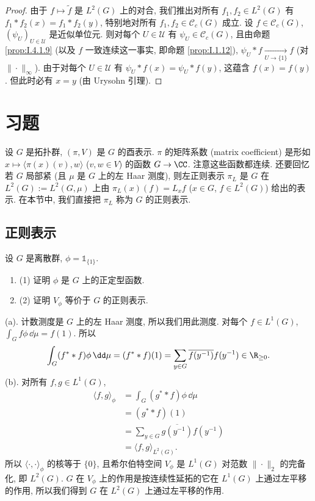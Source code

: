 \begin{proof}
由于 $f \longmapsto \tilde{f}$ 是 $L^2(G)$ 上的对合, 我们推出对所有 $f_1, f_2 \in L^2(G)$ 有 $f_1 * f_2(x) = f_1 * f_2(y)$, 特别地对所有 $f_1, f_2 \in \mathcal{C}_c(G)$ 成立. 设 $f \in \mathcal{C}_c(G)$, $(\psi_U)_{U \in \mathcal{U}}$ 是近似单位元. 则对每个 $U \in \mathcal{U}$ 有 $\psi_U \in \mathcal{C}_c(G)$, 且由命题 \ref{prop:I.4.1.9} (以及 $f$ 一致连续这一事实, 即命题 \ref{prop:I.1.12}), $\psi_U * f \xrightarrow[U \to \{1\}]{} f$ (对 $\|\cdot\|_{\infty}$). 由于对每个 $U \in \mathcal{U}$ 有 $\psi_U * f(x) = \psi_U * f(y)$, 这蕴含 $f(x) = f(y)$. 但此时必有 $x = y$ (由 Urysohn 引理).
\end{proof}

\section{习题}
设 $G$ 是拓扑群, $(\pi, V)$ 是 $G$ 的酉表示. $\pi$ 的矩阵系数 (matrix coefficient) 是形如 $x \longmapsto \langle \pi(x)(v), w \rangle$ ($v, w \in V$) 的函数 $G \to \CC$. 注意这些函数都连续.
还要回忆若 $G$ 局部紧 (且 $\mu$ 是 $G$ 上的左 Haar 测度), 则左正则表示 $\pi_L$ 是 $G$ 在 $L^2(G) := L^2(G, \mu)$ 上由 $\pi_L(x)(f) = L_xf$ ($x \in G$, $f \in L^2(G)$) 给出的表示. 在本节中, 我们直接把 $\pi_L$ 称为 $G$ 的正则表示.

\subsection{正则表示}

\begin{exercise}[离散群的情形]
\label{ex:III.6.1.1}
设 $G$ 是离散群, $\phi = \mathbb{1}_{\{1\}}$.
\begin{enumerate}
\item[(a)] (1) 证明 $\phi$ 是 $G$ 上的正定型函数.
\item[(b)] (2) 证明 $V_{\phi}$ 等价于 $G$ 的正则表示.
\end{enumerate}
\end{exercise}

\begin{solution}
(a). 计数测度是 $G$ 上的左 Haar 测度, 所以我们用此测度. 对每个 $f \in L^1(G)$, $\int_G f\phi\,\dd\mu = f(1)$. 所以
\[
\int_G (f^* * f)\phi\,\dd\mu = (f^* * f)(1) = \sum_{y \in G}\overline{f(y^{-1})}f(y^{-1}) \in \R_{\geq 0}.
\]
(b). 对所有 $f, g \in L^1(G)$,
\begin{align*}
\langle f, g \rangle_{\phi} &= \int_G (g^* * f)\phi\,\dd\mu \\
&= (g^* * f)(1) \\
&= \sum_{y \in G}\overline{g(y^{-1})}f(y^{-1}) \\
&= \langle f, g \rangle_{L^2(G)}.
\end{align*}
所以 $\langle \cdot, \cdot \rangle_{\phi}$ 的核等于 $\{0\}$, 且希尔伯特空间 $V_{\phi}$ 是 $L^1(G)$ 对范数 $\|\cdot\|_2$ 的完备化, 即 $L^2(G)$. $G$ 在 $V_{\phi}$ 上的作用是按连续性延拓的它在 $L^1(G)$ 上通过左平移的作用, 所以我们得到 $G$ 在 $L^2(G)$ 上通过左平移的作用.
\end{solution}

